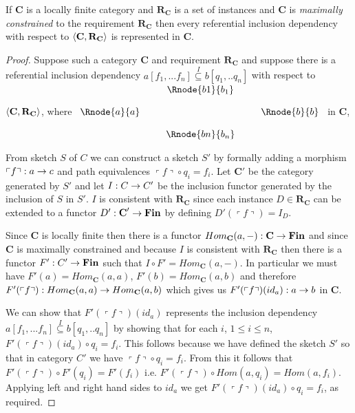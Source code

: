 \documentclass[10pt,a4paper]{article}
\theoremstyle{remark}
\newcommand{\catc}[1][C]{\textbf{#1}}
\newcommand{\catcp}[1][C]{\textbf{#1}'}
\newcommand{\reqt}{\textbf{R}}
\newcommand{\reqtc}[1][\catc]{\reqt_{#1}}
\newcommand{\Fin}{\ensuremath{\textbf{Fin}} }
\newcommand{\qq}[1]{
\left\ulcorner#1\right\urcorner
}
\newcommand{\term}[1]{\textit{#1}}  %
\begin{document}
\begin{lemma}
\label{catincdsrepresented}
If $\catc$ is a locally finite category and $\reqtc$ is a set of instances  and $\catc$ is 
\term{maximally constrained} to the requirement $\reqtc$ then
every referential inclusion dependency with respect to $\tuple{\catc,\reqtc}$ is represented in $\catc$.
\end{lemma}
\begin{proof}
Suppose such  a category $\catc$ and  requirement $\reqtc$ 
 and suppose there is a referential inclusion dependency
$a[f_1,...f_n] \overset{I}{\subseteq} b[q_1,..q_n]$ with respect to $\tuple{\catc,\reqtc}$,
where
$
\begin{array}{c p{0.25cm} c  p{0.25cm} c }
             &&   \Rnode{b1}{b_1} &&              \\[0.4cm]
\Rnode{a}{a} &&                   && \Rnode{b}{b} \\[0.4cm]
             &&   \Rnode{bn}{b_n} &&              
\end{array} 
$
in $\catc$, 

From sketch $S$ of $C$ we can construct a sketch $S'$ by formally adding a morphism $\qq{f}: a \morph c$
and path equivalences $\qq{f} \circ q_i = f_i$. Let $\catcp$ be the category generated by $S'$ and
let $I: C \rightarrow C'$ be the inclusion functor generated by the inclusion of $S$ in $S'$. $I$ is consistent with $\reqtc$ since
each instance $D \in  \reqtc$ can be extended to a functor $D': \catcp \morph \Fin$ by defining $D'(\qq{f})=I_D$.

Since $\catc$ is locally finite then there is a functor $Hom_{\catc}(a,-): \catc \morph \Fin$ and since $\catc$ is maximally constrained and because $I$ is consistent with $\reqtc$ then there is a functor $F': C' \morph \Fin$
such that $I \circ F' = Hom_{\catc}(a,-)$. In particular we must have 
$F'(a)=Hom_{\catc}(a,a)$,
$F'(b)=Hom_{\catc}(a,b)$ and therefore $F'(\qq{f}):Hom_{\catc}(a,a) \morph Hom_{\catc}(a,b)$ which gives us
$F'(\qq{f})(id_a): a \morph b$ in $\catc$. 

We can show that $F'(\qq{f})(id_a)$ represents
the inclusion dependency $a[f_1,...f_n] \overset{I}{\subseteq} b[q_1,..q_n]$ by showing that for 
each $i$, $1 \leq i \leq n$, $F'(\qq{f})(id_a) \circ q_i = f_i$. This follows because we have defined
the sketch $S'$ so that in category $C'$ we have $\qq{f} \circ q_i = f_i$. From this it follows
that $F'(\qq{f}) \circ F'(q_i) = F'(f_i)$ i.e. $F'(\qq{f}) \circ Hom(a,q_i) = Hom(a,f_i)$. Applying left and right hand sides to $id_a$ we get $F'(\qq{f})(id_a) \circ q_i = f_i$, as required.
\end{proof}
\end{document}
